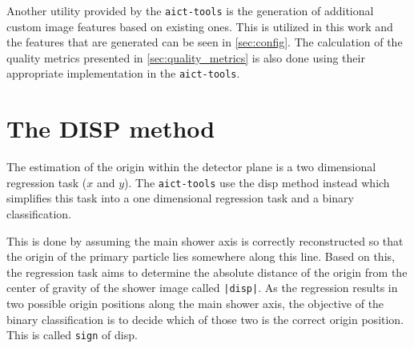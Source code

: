 Another utility provided by the \texttt{aict-tools} is the generation of additional custom image features based on existing ones.
This is utilized in this work and the features that are generated can be seen in \autoref{sec:config}. 
The calculation of the quality metrics presented in \autoref{sec:quality_metrics} is also done using their appropriate implementation in the \texttt{aict-tools}.


\section{The DISP method}
The estimation of the origin within the detector plane is a two dimensional regression task ($x$ and $y$).
The \texttt{aict-tools} use the disp method instead which simplifies this task into a one dimensional regression task and a binary classification.

This is done by assuming the main shower axis is correctly reconstructed so that the origin of the primary particle lies somewhere along this line.
Based on this, the regression task aims to determine the absolute distance of the origin from the center of gravity of the shower image called \texttt{|disp|}.
As the regression results in two possible origin positions along the main shower axis, the objective of the binary classification is to decide which
of those two is the correct origin position.
This is called \texttt{sign} of disp.
